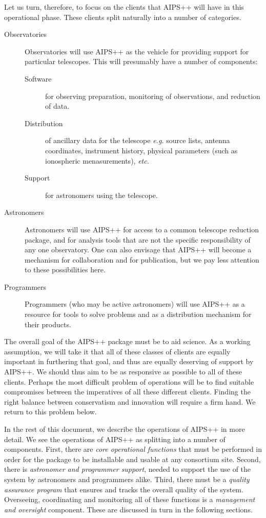 Let us turn, therefore, to focus on the clients that AIPS++ will have in
this operational phase. These clients split naturally into a number of
categories.

\begin{description}
\item[Observatories] Observatories will use AIPS++ as the vehicle for
providing support for particular telescopes. This will presumably have
a number of components:
\begin{description}
\item[Software] for observing preparation, monitoring of observations,
and reduction of data.
\item[Distribution] of ancillary data for the telescope {\em e.g.}
source lists, antenna coordinates, instrument history, physical 
parameters (such as ionospheric menasurements), {\em etc.}
\item[Support] for astronomers using the telescope.
\end{description}
\item[Astronomers] Astronomers will use AIPS++ for access to
a common telescope reduction package, and for analysis tools that are
not the specific responsibility of any one observatory. One can also
envisage that AIPS++ will become a mechanism for collaboration and for
publication, but we pay less attention to these possibilities here.
\item[Programmers] Programmers (who may be active astronomers) will use AIPS++
as a resource for tools to solve problems and as a distribution mechanism for
their products.
\end{description}

The overall goal of the AIPS++ package must be to aid science. As a
working assumption, we will take it that all of these classes of
clients are equally important in furthering that goal, and thus are
equally deserving of support by AIPS++.  We should thus aim to be as
responsive as possible to all of these clients. Perhaps the most
difficult problem of operations will be to find suitable compromises
between the imperatives of all these different clients. Finding the
right balance between conservatism and innovation will require a firm
hand. We return to this problem below.

In the rest of this document, we describe the operations of AIPS++ in
more detail. We see the operations of AIPS++ as splitting into a
number of components. First, there are {\em core operational
functions} that must be performed in order for the package to be
installable and usable at any consortium site. Second, there is {\em
astronomer and programmer support}, needed to support the use of the
system by astronomers and programmers alike. Third, there must be a
{\em quality assurance program} that ensures and tracks the overall
quality of the system.  Overseeing, coordinating and monitoring all of
these functions is a {\em management and oversight} component. These
are discussed in turn in the following sections.

